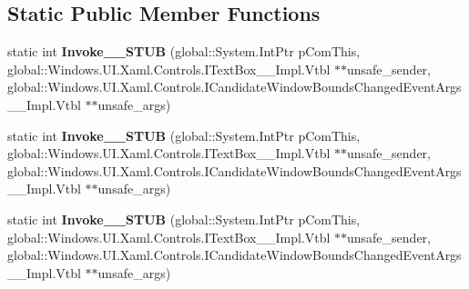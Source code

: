 \subsection*{Static Public Member Functions}
\begin{DoxyCompactItemize}
\item 
\mbox{\label{struct_windows_1_1_foundation_1_1_typed_event_handler___a___windows___u_i___xaml___controls___tea8675657ada60f534086508fa4403c3f_a16c64096fc9356d660072d85a9a8e919}} 
static int {\bfseries Invoke\+\_\+\+\_\+\+S\+T\+UB} (global\+::\+System.\+Int\+Ptr p\+Com\+This, global\+::\+Windows.\+U\+I.\+Xaml.\+Controls.\+I\+Text\+Box\+\_\+\+\_\+\+Impl.\+Vtbl $\ast$$\ast$unsafe\+\_\+sender, global\+::\+Windows.\+U\+I.\+Xaml.\+Controls.\+I\+Candidate\+Window\+Bounds\+Changed\+Event\+Args\+\_\+\+\_\+\+Impl.\+Vtbl $\ast$$\ast$unsafe\+\_\+args)
\item 
\mbox{\label{struct_windows_1_1_foundation_1_1_typed_event_handler___a___windows___u_i___xaml___controls___tea8675657ada60f534086508fa4403c3f_a16c64096fc9356d660072d85a9a8e919}} 
static int {\bfseries Invoke\+\_\+\+\_\+\+S\+T\+UB} (global\+::\+System.\+Int\+Ptr p\+Com\+This, global\+::\+Windows.\+U\+I.\+Xaml.\+Controls.\+I\+Text\+Box\+\_\+\+\_\+\+Impl.\+Vtbl $\ast$$\ast$unsafe\+\_\+sender, global\+::\+Windows.\+U\+I.\+Xaml.\+Controls.\+I\+Candidate\+Window\+Bounds\+Changed\+Event\+Args\+\_\+\+\_\+\+Impl.\+Vtbl $\ast$$\ast$unsafe\+\_\+args)
\item 
\mbox{\label{struct_windows_1_1_foundation_1_1_typed_event_handler___a___windows___u_i___xaml___controls___tea8675657ada60f534086508fa4403c3f_a16c64096fc9356d660072d85a9a8e919}} 
static int {\bfseries Invoke\+\_\+\+\_\+\+S\+T\+UB} (global\+::\+System.\+Int\+Ptr p\+Com\+This, global\+::\+Windows.\+U\+I.\+Xaml.\+Controls.\+I\+Text\+Box\+\_\+\+\_\+\+Impl.\+Vtbl $\ast$$\ast$unsafe\+\_\+sender, global\+::\+Windows.\+U\+I.\+Xaml.\+Controls.\+I\+Candidate\+Window\+Bounds\+Changed\+Event\+Args\+\_\+\+\_\+\+Impl.\+Vtbl $\ast$$\ast$unsafe\+\_\+args)
\item 

\end{DoxyCompactItemize}
